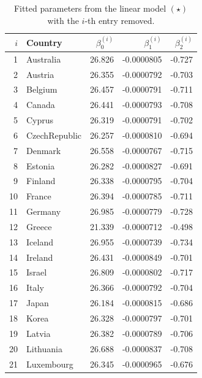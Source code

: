\documentclass[10pt]{article}
\begin{document}
    \begin{table}[H]
        \centering
        \caption{Fitted parameters from the linear model $(\star)$ with the $i$-th
        entry removed.}
        \vspace{1em}
        \label{tab:parameters_loocv}
        \begin{tabular}{rlrrr}
          \hline
         $i$ & Country & $\beta_0^{(i)}$ & $\beta_1^{(i)}$ & $\beta_2^{(i)}$ \\
          \hline
              1 & Australia & 26.826 & -0.0000805 & -0.727 \\
              2 & Austria & 26.355 & -0.0000792 & -0.703 \\
              3 & Belgium & 26.457 & -0.0000791 & -0.711 \\
              4 & Canada & 26.441 & -0.0000793 & -0.708 \\
              5 & Cyprus & 26.319 & -0.0000791 & -0.702 \\
              6 & CzechRepublic & 26.257 & -0.0000810 & -0.694 \\
              7 & Denmark & 26.558 & -0.0000767 & -0.715 \\
              8 & Estonia & 26.282 & -0.0000827 & -0.691 \\
              9 & Finland & 26.338 & -0.0000795 & -0.704 \\
              10 & France & 26.394 & -0.0000785 & -0.711 \\
              11 & Germany & 26.985 & -0.0000779 & -0.728 \\
              12 & Greece & 21.339 & -0.0000712 & -0.498 \\
              13 & Iceland & 26.955 & -0.0000739 & -0.734 \\
              14 & Ireland & 26.431 & -0.0000849 & -0.701 \\
              15 & Israel & 26.809 & -0.0000802 & -0.717 \\
              16 & Italy & 26.366 & -0.0000792 & -0.704 \\
              17 & Japan & 26.184 & -0.0000815 & -0.686 \\
              18 & Korea & 26.328 & -0.0000797 & -0.701 \\
              19 & Latvia & 26.382 & -0.0000789 & -0.706 \\
              20 & Lithuania & 26.688 & -0.0000837 & -0.708 \\
              21 & Luxembourg & 26.345 & -0.0000965 & -0.676 \\

\end{tabular}
\end{table}
\end{document}
